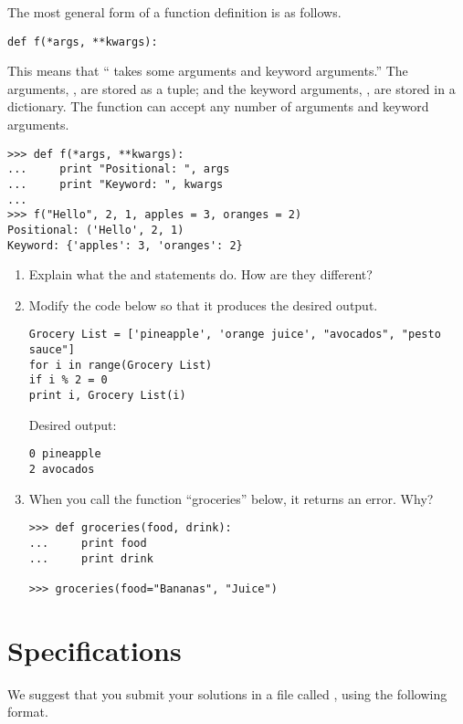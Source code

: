 The most general form of a function definition is as follows.
\begin{lstlisting}
def f(*args, **kwargs):
\end{lstlisting}
This means that `` takes some arguments and keyword arguments.''
The arguments, , are stored as a tuple; and the keyword arguments, , are stored in a dictionary.
The function  can accept any number of arguments and keyword arguments.
\begin{lstlisting}
>>> def f(*args, **kwargs):
...     print "Positional: ", args
...     print "Keyword: ", kwargs
...     
>>> f("Hello", 2, 1, apples = 3, oranges = 2)
Positional: ('Hello', 2, 1)
Keyword: {'apples': 3, 'oranges': 2}
\end{lstlisting}

\begin{problem}

\begin{enumerate}
\item Explain what the  and  statements do. How are they different?
\item Modify the code below so that it produces the desired output.
\begin{lstlisting}
Grocery List = ['pineapple', 'orange juice', "avocados", "pesto sauce"]
for i in range(Grocery List)
if i % 2 = 0
print i, Grocery List(i)
\end{lstlisting}
Desired output:
\begin{lstlisting}
0 pineapple
2 avocados
\end{lstlisting}
\item When you call the function ``groceries'' below, it returns an error. Why?
\begin{lstlisting}
>>> def groceries(food, drink):
...     print food
...     print drink    

>>> groceries(food="Bananas", "Juice")
\end{lstlisting}
\end{enumerate}
\end{problem}



\section*{Specifications}
We suggest that you submit your solutions in a file called , using the following format.

